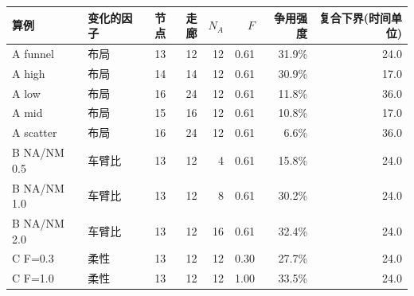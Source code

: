 \begin{tabular}{@{}llrrrrrr@{}}
\toprule
算例 & 变化的因子 & 节点 & 走廊 & $N_A$ & $F$ & 争用强度 & 复合下界(时间单位) \\
\midrule
A funnel & 布局 & 13 & 12 & 12 & 0.61 & 31.9\% & 24.0 \\
A high & 布局 & 14 & 14 & 12 & 0.61 & 30.9\% & 17.0 \\
A low & 布局 & 16 & 24 & 12 & 0.61 & 11.8\% & 36.0 \\
A mid & 布局 & 15 & 16 & 12 & 0.61 & 10.8\% & 17.0 \\
A scatter & 布局 & 16 & 24 & 12 & 0.61 & 6.6\% & 36.0 \\
\midrule
B NA/NM 0.5 & 车臂比 & 13 & 12 & 4 & 0.61 & 15.8\% & 24.0 \\
B NA/NM 1.0 & 车臂比 & 13 & 12 & 8 & 0.61 & 30.2\% & 24.0 \\
B NA/NM 2.0 & 车臂比 & 13 & 12 & 16 & 0.61 & 32.4\% & 24.0 \\
\midrule
C F=0.3 & 柔性 & 13 & 12 & 12 & 0.30 & 27.7\% & 24.0 \\
C F=1.0 & 柔性 & 13 & 12 & 12 & 1.00 & 33.5\% & 24.0 \\
\bottomrule
\end{tabular}
